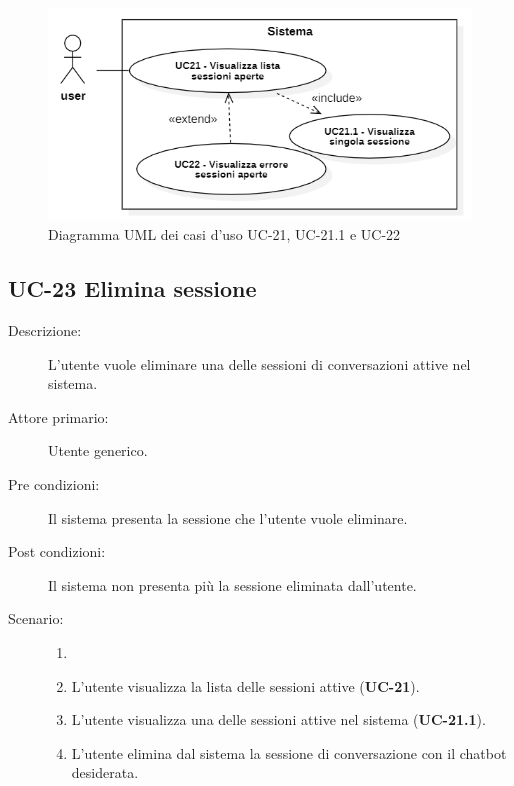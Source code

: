 \begin{figure}[H]
    \centering
    \includegraphics[width=0.8\linewidth]{UC21-22.png} %
    \caption{Diagramma UML dei casi d'uso UC-21, UC-21.1 e UC-22}
    \label{fig:UC24-25}
\end{figure}

\subsection{UC-23 Elimina sessione}
\begin{description}
    \item[Descrizione:] L'utente vuole eliminare una delle sessioni di conversazioni attive nel sistema.
    \item[Attore primario:] Utente generico.
    \item[Pre condizioni:] Il sistema presenta la sessione che l'utente vuole eliminare.
    \item[Post condizioni:] Il sistema non presenta più la sessione eliminata dall'utente.
    \item[Scenario:] 
    \begin{enumerate}
        \item[]
        \item L'utente visualizza la lista delle sessioni attive (\textbf{UC-21}).
        \item L'utente visualizza una delle sessioni attive nel sistema (\textbf{UC-21.1}).
        \item L'utente elimina dal sistema la sessione di conversazione con il chatbot desiderata.
    \end{enumerate}
\end{description}

